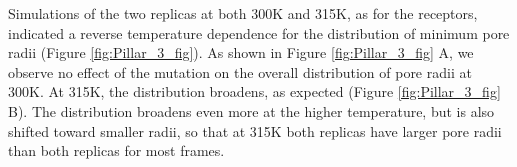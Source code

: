 \documentclass[9pt,twocolumn,twoside,lineno]{pnas-new}
\begin{document}
Simulations of the two \MT replicas at both 300K and 315K, as for the \WT receptors, indicated a reverse temperature dependence for the distribution of minimum pore radii  (Figure \ref{fig:Pillar_3_fig}).  %
As shown in Figure \ref{fig:Pillar_3_fig} A, we observe no effect of the mutation on the overall distribution of pore radii at 300K.  At 315K, the \WT distribution broadens, as expected (Figure \ref{fig:Pillar_3_fig} B).  The \MT distribution broadens even more at the higher temperature,  but is also shifted toward smaller radii, so that at 315K both \WT replicas have larger pore radii than both \MT replicas for most frames. 
\end{document}
